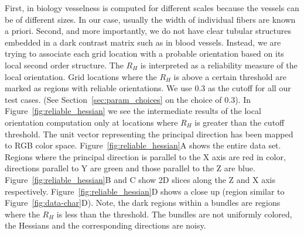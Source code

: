 First, in biology vesselness is computed for different scales because the vessels can be of different sizes. In our case, usually the width of individual fibers are known a priori.
Second, and more importantly, we do not have clear tubular structures embedded in a dark contrast matrix such as in blood vessels.
Instead, we are trying to associate each grid location  with a probable orientation based on its local second order structure. The $R_{H}$ is interpreted as a reliability measure of the local orientation.
Grid locations where the $R_{H}$ is above a certain threshold are marked as regions with reliable orientations.
We use 0.3 as the cutoff for all our test cases. (See Section~\ref{sec:param_choices} on the choice of 0.3).
In Figure~\ref{fig:reliable_hessian} we see the intermediate results of the local orientation computation only at locations where $R_{H}$ is greater than the cutoff threshold. The unit vector representing the principal direction has been mapped to RGB color space. Figure~\ref{fig:reliable_hessian}A shows the entire data set. Regions where the principal direction is parallel to the X axis are red in color, directions parallel to Y are green and those parallel to the Z are blue. Figure~\ref{fig:reliable_hessian}B and C show 2D slices along the Z and X axis respectively. Figure~\ref{fig:reliable_hessian}D shows a close up (region similar to Figure~\ref{fig:data-char}D). Note, the dark regions within a bundles are regions where the $R_H$ is less than the threshold. The bundles are not uniformly colored, the Hessians and the corresponding directions are noisy.

